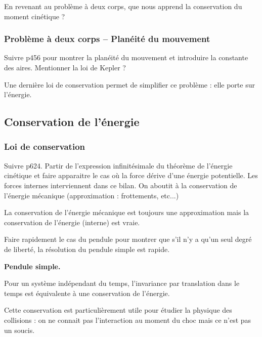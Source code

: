 \begin{transition}
En revenant au problème à deux corps, que nous apprend la conservation du moment cinétique ?
\end{transition}

\subsubsection{Problème à deux corps -- Planéité du mouvement}

Suivre \cite{Michel2017} p456 pour montrer la planéité du mouvement et introduire la constante des aires.
Mentionner la loi de Kepler ?

\begin{transition}
Une dernière loi de conservation permet de simplifier ce problème : elle porte sur l'énergie.
\end{transition}

\subsection{Conservation de l'énergie}

\subsubsection{Loi de conservation}

Suivre \cite{Salamito2016} p624.
Partir de l'expression infinitésimale du théorème de l'énergie cinétique et faire apparaitre le cas où la force dérive d'une énergie potentielle.
Les forces internes interviennent dans ce bilan.
On aboutit à la conservation de l'énergie mécanique (approximation : frottements, etc...)

\begin{remarque}
La conservation de l'énergie mécanique est toujours une approximation mais la conservation de l'énergie (interne) est vraie.
\end{remarque}

Faire rapidement le cas du pendule pour montrer que s'il n'y a qu'un seul degré de liberté, la résolution du pendule simple est rapide.
\begin{experience}
\textbf{Pendule simple.}
\end{experience}

Pour un système indépendant du temps, l'invariance par translation dans le temps est équivalente à une conservation de l'énergie.

\begin{transition}
Cette conservation est particulièrement utile pour étudier la physique des collisions : on ne connait pas l'interaction au moment du choc mais ce n'est pas un soucis.
\end{transition}

